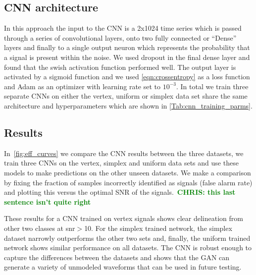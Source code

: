 \documentclass[12pt]{iopart}
\newcommand{\chris}[1]{\textbf{\textcolor{green}{CHRIS: #1}}}
\begin{document}
\subsection{CNN architecture}
In this approach the input to the \ac{CNN} is a 2x1024 time series which is passed through a series of convolutional layers, onto two fully connected or ``Dense'' layers and finally to a single output neuron which represents the probability that a signal is present within the noise. We used dropout in the final dense layer and found that the swish activation \cite{ramachandran2017searching} function performed well. The output layer is activated by a sigmoid function and we used \cref{eqn:crossentropy} as a loss function and Adam as an optimizer with learning rate set to $10^{-3}$. In total we train three separate \acp{CNN} on either the vertex, uniform or simplex data set share the same architecture and hyperparameters which are shown in \cref{Tab:cnn_training_parms}.


\subsection{Results}
In~\cref{fig:eff_curves} we compare the \ac{CNN} results between the three
datasets, we train three \acp{CNN} on the vertex, simplex and uniform data sets
and use these models to make predictions on the other unseen datasets. We make
a comparison by fixing the fraction of samples incorrectly identified as
signals (false alarm rate) and plotting this versus the optimal SNR of the
signals.~\chris{this last sentence isn't quite right} 

These results for a \ac{CNN} trained on vertex signals shows clear delineation from other two classes at snr$>$10. For the simplex trained network, the simplex dataset narrowly outperforms the other two sets and, finally, the uniform trained network shows similar performance on all datasets. The \ac{CNN} is
robust enough to capture the differences between the datasets and shows that
the GAN can generate a variety of unmodeled waveforms that can be used in
future testing. 

\end{document}
